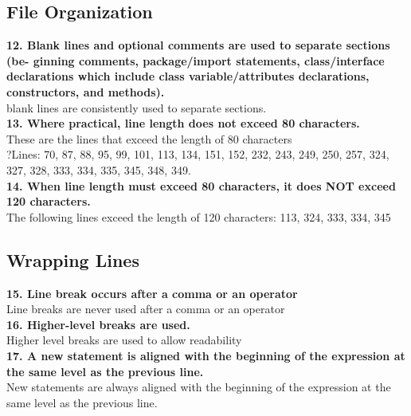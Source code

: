 \documentclass{article}
\begin{document}
\begin{flushleft}
\subsection{ File Organization}
\textbf{12. Blank lines and optional comments are used to separate sections (be- ginning comments, package/import statements, class/interface declarations which include class variable/attributes declarations, constructors, and methods).}\\
\vspace{0.5cm}
blank lines are consistently used to separate sections. \\
\vspace{0.5cm}
\textbf{13. Where practical, line length does not exceed 80 characters.}\\
\vspace{0.5cm}
These are the lines that exceed the length of 80 characters\\
\vspace{0.5cm}?Lines: 70, 87, 88, 95, 99, 101, 113, 134, 151, 152, 232, 243, 249, 250, 257, 324, 327, 328, 333, 334, 335, 345, 348, 349. \\
\vspace{0.5cm}
\textbf{14. When line length must exceed 80 characters, it does NOT exceed 120 characters.}\\
\vspace{0.5cm}
The following lines exceed the length of 120 characters: 113, 324, 333, 334, 345 \\
\vspace{0.5cm}


\subsection{Wrapping Lines}
\textbf{15. Line break occurs after a comma or an operator}\\
\vspace{0.5cm}
Line breaks are never used after a comma or an operator\\
\vspace{0.5cm}
\textbf{16. Higher-level breaks are used.}\\
\vspace{0.5cm}
Higher level breaks are used to allow readability\\
\vspace{0.5cm}
\textbf{17. A new statement is aligned with the beginning of the expression at the same level as the previous line.}\\
\vspace{0.5cm}
New statements are always aligned with the beginning of the expression at the same level as the previous line.\\
\vspace{0.5cm}



\end{flushleft}
\end{document}
